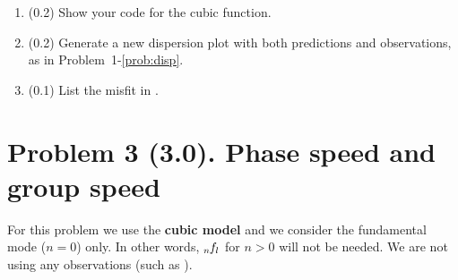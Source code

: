 \documentclass[11pt,titlepage,fleqn]{article}
\begin{document}
\begin{enumerate}
\begin{enumerate}
\item (0.2) Show your code for the cubic function.
\item (0.2) Generate a new dispersion plot with both predictions and observations, as in Problem~1-\ref{prob:disp}.
\item (0.1) List the misfit in .
\end{enumerate}

\label{prob:earth_cubic}

%


\end{enumerate}


\section*{Problem 3 (3.0). Phase speed and group speed}

For this problem we use the {\bf cubic model} and we consider the fundamental mode ($n=0$) only. In other words, $\mbox{${}_{n\hspace{-0.2 mm}}f_l$}$ for $n > 0$ will not be needed. We are not using any observations (such as ).
\end{document}
